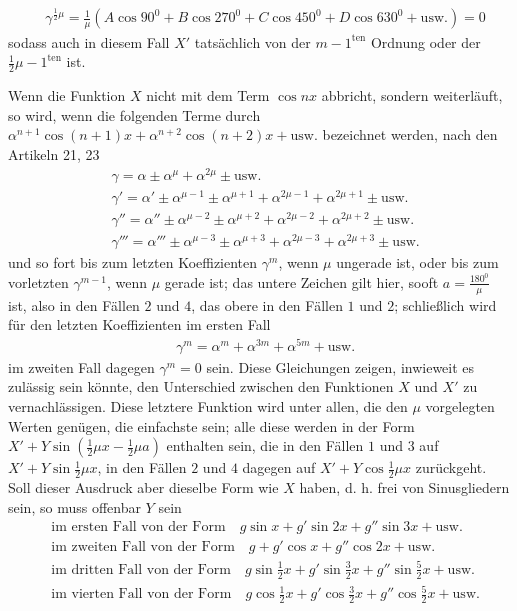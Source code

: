 \[
\begin{aligned}
&\gamma^{\frac12\mu}=\frac{1}{\mu}(A\cos 90^{{\mathord{0}}}+B\cos 270^{{\mathord{0}}}+C\cos 450^{{\mathord{0}}}+D\cos 630^{{\mathord{0}}}+\mathrm{usw.})=0
\end{aligned}
\]
sodass auch in diesem Fall $X'$ tatsächlich von der $m-1^{\mathrm{ten}}$ Ordnung oder der $\frac12\mu-1^{\mathrm{ten}}$ ist.


Wenn die Funktion $X$ nicht mit dem Term $\cos nx$ abbricht, sondern weiterläuft, so wird, wenn die folgenden Terme durch \hfill\break{}
$\alpha^{n+1}\cos(n+1)x+\alpha^{n+2}\cos(n+2)x+\mathrm{usw.}$ bezeichnet werden, nach den Artikeln 21, 23
\[
\begin{aligned}
&\gamma = \alpha\pm\alpha^{\mu}+\alpha^{2\mu}\pm\mathrm{usw.}\\[5pt]
&\gamma' = \alpha'\pm\alpha^{\mu-1}\pm\alpha^{\mu+1}+\alpha^{2\mu-1}+\alpha^{2\mu+1}\pm\mathrm{usw.}\\[5pt]
&\gamma'' = \alpha''\pm\alpha^{\mu-2}\pm\alpha^{\mu+2}+\alpha^{2\mu-2}+\alpha^{2\mu+2}\pm\mathrm{usw.}\\[5pt]
&\gamma''' = \alpha'''\pm\alpha^{\mu-3}\pm\alpha^{\mu+3}+\alpha^{2\mu-3}+\alpha^{2\mu+3}\pm\mathrm{usw.}
\end{aligned}
\]
und so fort bis zum letzten Koeffizienten $\gamma^m$, wenn $\mu$ ungerade ist, oder bis zum vorletzten $\gamma^{m-1}$, wenn $\mu$ gerade ist; das untere Zeichen gilt hier, sooft $a=\frac{180^{{\mathord{0}}}}{\mu}$ ist, also
in den Fällen $2$ und $4$, das obere in den Fällen $1$ und $2$; schließlich wird für den letzten Koeffizienten im ersten Fall
\[
\begin{aligned}
&\gamma^m=\alpha^m+\alpha^{3m}+\alpha^{5m}+\mathrm{usw.}
\end{aligned}
\]
im zweiten Fall dagegen $\gamma^m=0$ sein. Diese Gleichungen zeigen, inwieweit es zulässig sein könnte, den Unterschied zwischen den Funktionen $X$ und $X'$ zu vernachlässigen. Diese letztere Funktion wird unter allen, die den $\mu$ vorgelegten Werten genügen, die einfachste sein; alle diese werden in der Form $X'+Y\sin(\frac12\mu x-\frac12\mu a)$ enthalten sein, die in den Fällen $1$ und $3$ auf $X'+Y\sin\frac12\mu x$, in den Fällen $2$ und $4$ dagegen auf $X'+Y\cos\frac12\mu x$ zurückgeht. Soll dieser Ausdruck aber dieselbe Form wie $X$ haben, d. h. frei von Sinusgliedern sein, so muss offenbar $Y$ sein
\[
\begin{aligned}
&\text{im ersten Fall von der Form} \quad  g\sin x+g'\sin 2x+g''\sin 3x+\mathrm{usw.}\\[5pt]
&\text{im zweiten Fall von der Form} \quad  g+g'\cos x+g''\cos 2x+\mathrm{usw.}\\[5pt]
&\text{im dritten Fall von der Form} \quad  g\sin\frac12 x+g'\sin\frac32 x+g''\sin\frac52 x+\mathrm{usw.}\\[5pt]
&\text{im vierten Fall von der Form} \quad  g\cos\frac12 x+g'\cos\frac32 x+g''\cos\frac52 x+\mathrm{usw.}
\end{aligned}
\]
